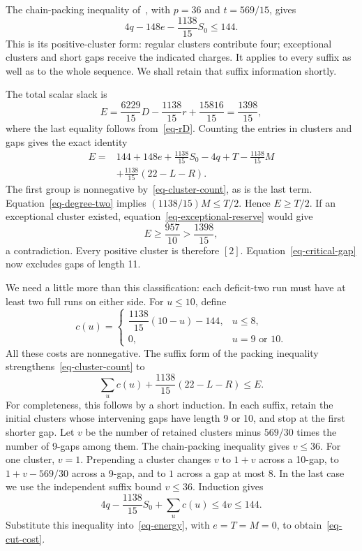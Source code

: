 \documentclass[11pt]{article}
\begin{document}
The chain-packing inequality of~\cite{returns}, with $p=36$ and
$t=569/15$, gives
\begin{equation}\label{eq-cluster-count}
 4q-148e-\frac{1138}{15}S_0\le144.
\end{equation}
This is its positive-cluster form: regular clusters contribute four;
exceptional clusters and short gaps receive the indicated charges.
It applies to every suffix as well as to the whole sequence. We shall
retain that suffix information shortly.

The total scalar slack is
\[
 E=\frac{6229}{15}D-\frac{1138}{15}r+\frac{15816}{15}
   =\frac{1398}{15},
\]
where the last equality follows from~\eqref{eq-rD}. Counting the entries
in clusters and gaps gives the exact identity
\begin{equation}\label{eq-energy}
\begin{split}
 E={}&144+148e+\frac{1138}{15}S_0-4q+T
       -\frac{1138}{15}M\\
    &+\frac{1138}{15}(22-L-R).
\end{split}
\end{equation}
The first group is nonnegative by~\eqref{eq-cluster-count}, as is the
last term. Equation~\eqref{eq-degree-two} implies
$(1138/15)M\le T/2$. Hence $E\ge T/2$. If an exceptional cluster
existed, equation~\eqref{eq-exceptional-reserve} would give
\[
 E\ge\frac{957}{10}>\frac{1398}{15},
\]
a contradiction. Every positive cluster is therefore $[2]$.
Equation~\eqref{eq-critical-gap} now excludes gaps of length 11.

We need a little more than this classification: each deficit-two run
must have at least two full runs on either side. For $u\le10$, define
\[
 c(u)=
 \begin{cases}
 \dfrac{1138}{15}(10-u)-144,&u\le8,\\
 0,&u=9\text{ or }10.
 \end{cases}
\]
All these costs are nonnegative. The suffix form of the packing
inequality strengthens~\eqref{eq-cluster-count} to
\begin{equation}\label{eq-cut-cost}
 \sum_u c(u)+\frac{1138}{15}(22-L-R)\le E.
\end{equation}
For completeness, this follows by a short induction. In each suffix,
retain the initial clusters whose intervening gaps have length 9 or 10,
and stop at the first shorter gap. Let $v$ be the number of retained
clusters minus $569/30$ times the number of 9-gaps among them. The
chain-packing inequality gives $v\le36$. For one cluster, $v=1$.
Prepending a cluster changes $v$ to $1+v$ across a
10-gap, to $1+v-569/30$ across a 9-gap, and to $1$ across a gap at most
8. In the last case we use the independent suffix bound $v\le36$.
Induction gives
\[
 4q-\frac{1138}{15}S_0+\sum_u c(u)\le4v\le144.
\]
Substitute this inequality into~\eqref{eq-energy}, with $e=T=M=0$, to
obtain~\eqref{eq-cut-cost}.
\end{document}
